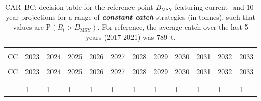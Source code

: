 \documentclass[11pt]{book}
\newcommand{\Bmsy}{B_\text{MSY}}
\newcommand{\itbf}[1]{\textit{\textbf{#1}}}
\begin{document}
\begin{longtable}[c]{>{\raggedright\let\newline\\\arraybackslash\hspace{0pt}}p{0.49in}>{\raggedleft\let\newline\\\arraybackslash\hspace{0pt}}p{0.49in}>{\raggedleft\let\newline\\\arraybackslash\hspace{0pt}}p{0.49in}>{\raggedleft\let\newline\\\arraybackslash\hspace{0pt}}p{0.49in}>{\raggedleft\let\newline\\\arraybackslash\hspace{0pt}}p{0.49in}>{\raggedleft\let\newline\\\arraybackslash\hspace{0pt}}p{0.54in}>{\raggedleft\let\newline\\\arraybackslash\hspace{0pt}}p{0.54in}>{\raggedleft\let\newline\\\arraybackslash\hspace{0pt}}p{0.54in}>{\raggedleft\let\newline\\\arraybackslash\hspace{0pt}}p{0.54in}>{\raggedleft\let\newline\\\arraybackslash\hspace{0pt}}p{0.54in}>{\raggedleft\let\newline\\\arraybackslash\hspace{0pt}}p{0.54in}>{\raggedleft\let\newline\\\arraybackslash\hspace{0pt}}p{0.54in}}
  \caption{CAR~BC: decision table for the reference point $\Bmsy$ featuring current- and 10-year projections for a range of \itbf{constant catch} strategies (in tonnes), such that values are P$(B_t > \Bmsy)$.  For reference, the average catch over the last 5 years (2017-2021) was 789~t. } \label{tab:car.gmu.Bmsy.CCs}\\  \hline\\[-2.2ex]  CC  & 2023 & 2024 & 2025 & 2026 & 2027 & 2028 & 2029 & 2030 & 2031 & 2032 & 2033 \\[0.2ex]\hline\\[-1.5ex]  \endfirsthead   \hline  CC  & 2023 & 2024 & 2025 & 2026 & 2027 & 2028 & 2029 & 2030 & 2031 & 2032 & 2033 \\[0.2ex]\hline\\[-1.5ex]  \endhead  \hline\\[-2.2ex]   \endfoot  \hline \endlastfoot  0 & 1 & 1 & 1 & 1 & 1 & 1 & 1 & 1 & 1 & 1 & 1 \\ 

\end{longtable}
\end{document}
